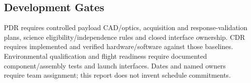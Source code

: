 \subsection{Development Gates}
PDR requires controlled payload CAD/optics, acquisition and response-validation plans, science eligibility/independence rules and closed interface ownership. CDR requires implemented and verified hardware/software against those baselines. Environmental qualification and flight readiness require documented component/assembly tests and launch interfaces. Dates and named owners require team assignment; this report does not invent schedule commitments.
